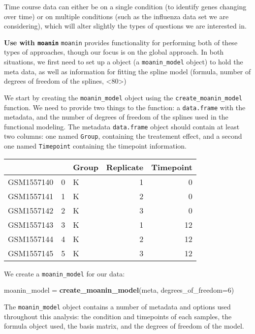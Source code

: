 \documentclass[9pt,a4paper,]{extarticle}
\newenvironment{Shaded}{\begin{snugshade}}{\end{snugshade}}
\newcommand{\DataTypeTok}[1]{\textcolor[rgb]{0.13,0.29,0.53}{#1}}
\newcommand{\DecValTok}[1]{\textcolor[rgb]{0.00,0.00,0.81}{#1}}
\newcommand{\KeywordTok}[1]{\textcolor[rgb]{0.13,0.29,0.53}{\textbf{#1}}}
\newcommand{\NormalTok}[1]{#1}
\newcommand{\StringTok}[1]{\textcolor[rgb]{0.31,0.60,0.02}{#1}}
\begin{document}
Time course data can either be on a single condition (to identify genes
changing over time) or on multiple conditions (such as the influenza
data set we are considering), which will alter slightly the types of questions
we are interested in.

\textbf{Use with \texttt{moanin}} \texttt{moanin} provides functionality for performing both of
these types of approaches, though our focus is on the global approach. In both
situations, we first need to set up a object (a \texttt{moanin\_model} object) to
hold the meta data, as well as information for fitting the spline model
(formula, number of degrees of freedom of the splines, \textless{}80\textgreater{})

We start by creating the \texttt{moanin\_model} object using the \texttt{create\_moanin\_model}
function. We need to provide two things to the function: a \texttt{data.frame} with
the metadata, and the number of degrees of freedom of the splines used in the
functional modeling. The metadata \texttt{data.frame} object should contain at least
two columns: one named \texttt{Group}, containing the treatement effect, and a
second one named \texttt{Timepoint} containing the timepoint information.

\begin{tabular}{l|r|l|r|r}
\hline
  &  & Group & Replicate & Timepoint\\
\hline
GSM1557140 & 0 & K & 1 & 0\\
\hline
GSM1557141 & 1 & K & 2 & 0\\
\hline
GSM1557142 & 2 & K & 3 & 0\\
\hline
GSM1557143 & 3 & K & 1 & 12\\
\hline
GSM1557144 & 4 & K & 2 & 12\\
\hline
GSM1557145 & 5 & K & 3 & 12\\
\hline
\end{tabular}

We create a \texttt{moanin\_model} for our data:

\begin{Shaded}
\begin{Highlighting}[]
\NormalTok{moanin_model =}\StringTok{ }\KeywordTok{create_moanin_model}\NormalTok{(meta, }\DataTypeTok{degrees_of_freedom=}\DecValTok{6}\NormalTok{)}
\end{Highlighting}
\end{Shaded}

The \texttt{moanin\_model} object contains a number of metadata and options used
throughout this analysis: the condition and timepoints of each samples, the
formula object used, the basis matrix, and the degrees of freedom of the model.
\end{document}
